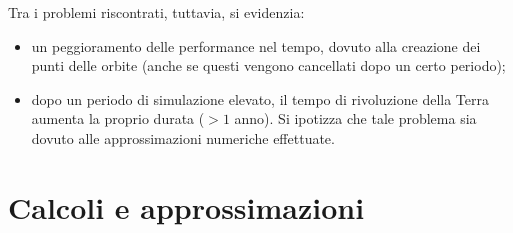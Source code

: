 \documentclass{article}
\begin{document}
Tra i problemi riscontrati, tuttavia, si evidenzia:
\begin{itemize}
    \item un peggioramento delle performance nel tempo, dovuto alla creazione dei punti delle orbite (anche se questi vengono cancellati dopo un certo periodo);
    \item dopo un periodo di simulazione elevato, il tempo di rivoluzione della Terra aumenta la proprio durata ($> 1$ anno). Si ipotizza che tale problema sia dovuto alle approssimazioni numeriche effettuate.
\end{itemize}

\subsection{}
\appendix
\section{Calcoli e approssimazioni}
\end{document}
